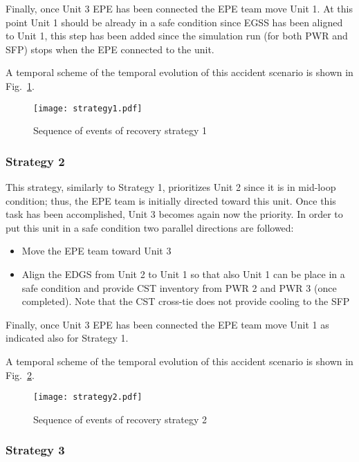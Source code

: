 Finally, once Unit 3 EPE has been connected the EPE team move Unit 1. At this point Unit 1 should be already in a 
safe condition since EGSS has been aligned to Unit 1, this step has been added since the simulation run (for 
both PWR and SFP) stops when the EPE connected to the unit.

A temporal scheme of the temporal evolution of this accident scenario is shown in Fig.~\ref{fig:strategy1Scheme}.   

\begin{figure}
    \centering
    \centerline{\texttt{[image: strategy1.pdf]}}
    \caption{Sequence of events of recovery strategy 1}
    \label{fig:strategy1Scheme}
\end{figure}

\subsubsection{Strategy 2}
\label{sec:strategy2}

This strategy, similarly to Strategy 1, prioritizes Unit 2 since it is in mid-loop condition; thus, the EPE 
team is initially directed toward this unit. 
Once this task has been accomplished, Unit 3 becomes again now the priority. In order to put this unit in a safe 
condition two parallel directions are followed:

\begin{itemize}
  \item Move the EPE team toward Unit 3 
  \item Align the EDGS from Unit 2 to Unit 1 so that also Unit 1 can be place in a safe condition and provide 
        CST inventory from PWR 2 and PWR 3 (once completed). Note that the CST cross-tie does not provide cooling 
        to the SFP
\end{itemize}

Finally, once Unit 3 EPE has been connected the EPE team move Unit 1 as indicated also for Strategy 1.

A temporal scheme of the temporal evolution of this accident scenario is shown in Fig.~\ref{fig:strategy2Scheme}.  

\begin{figure}
    \centering
    \centerline{\texttt{[image: strategy2.pdf]}}
    \caption{Sequence of events of recovery strategy 2}
    \label{fig:strategy2Scheme}
\end{figure}

\subsubsection{Strategy 3}
\label{sec:strategy3}

